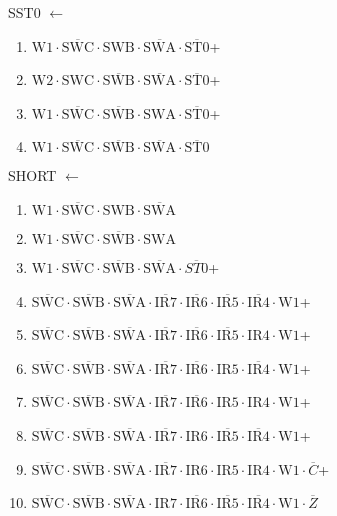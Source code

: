 \documentclass[UTF8]{ctexart}
\begin{document}
SST0 $\leftarrow$
\begin{enumerate}[\indent\indent]
	\item $\text{W1} \cdot \overline{\text{SWC}} \cdot \text{SWB} \cdot \overline{\text{SWA}} \cdot \overline{\text{ST0}}$+
	\item $\text{W2} \cdot \text{SWC} \cdot \overline{\text{SWB}} \cdot \overline{\text{SWA}} \cdot \overline{\text{ST0}}$+
	\item $\text{W1} \cdot \overline{\text{SWC}} \cdot \overline{\text{SWB}} \cdot \text{SWA} \cdot \overline{\text{ST0}}$+
	\item $\text{W1} \cdot \overline{\text{SWC}} \cdot \overline{\text{SWB}} \cdot \overline{\text{SWA}} \cdot \overline{\text{ST0}}$
\end{enumerate}

SHORT $\leftarrow$
\begin{enumerate}[\indent\indent]
	\item $\text{W1} \cdot \overline{\text{SWC}} \cdot \text{SWB} \cdot \overline{\text{SWA}}$
	\item $\text{W1} \cdot \overline{\text{SWC}} \cdot \overline{\text{SWB}} \cdot \text{SWA}$
	\item $\text{W1} \cdot \overline{\text{SWC}} \cdot \overline{\text{SWB}} \cdot \overline{\text{SWA}} \cdot \overline{ST0}$+
	\item $\overline{\text{SWC}} \cdot\overline{\text{SWB}}\cdot \overline{\text{SWA}} \cdot \overline{\text{IR7}} \cdot \overline{\text{IR6}} \cdot \overline{\text{IR5}} \cdot \overline{\text{IR4}} \cdot \text{W1}$+
	\item $\overline{\text{SWC}} \cdot\overline{\text{SWB}}\cdot \overline{\text{SWA}} \cdot \overline{\text{IR7}} \cdot \overline{\text{IR6}} \cdot \overline{\text{IR5}} \cdot \text{IR4} \cdot \text{W1}$+
	\item $\overline{\text{SWC}} \cdot\overline{\text{SWB}}\cdot \overline{\text{SWA}} \cdot \overline{\text{IR7}} \cdot \overline{\text{IR6}} \cdot \text{IR5} \cdot \overline{\text{IR4}} \cdot \text{W1}$+
	\item $\overline{\text{SWC}} \cdot\overline{\text{SWB}}\cdot \overline{\text{SWA}} \cdot \overline{\text{IR7}} \cdot \overline{\text{IR6}} \cdot \text{IR5} \cdot \text{IR4} \cdot \text{W1}$+
	\item $\overline{\text{SWC}} \cdot\overline{\text{SWB}}\cdot \overline{\text{SWA}} \cdot \overline{\text{IR7}} \cdot \text{IR6} \cdot \overline{\text{IR5}} \cdot \overline{\text{IR4}} \cdot \text{W1}$+
	\item $\overline{\text{SWC}} \cdot\overline{\text{SWB}}\cdot \overline{\text{SWA}} \cdot \overline{\text{IR7}} \cdot \text{IR6} \cdot \text{IR5} \cdot \text{IR4} \cdot \text{W1} \cdot \overline{C}$+
	\item $\overline{\text{SWC}} \cdot\overline{\text{SWB}}\cdot \overline{\text{SWA}} \cdot \text{IR7} \cdot \overline{\text{IR6}} \cdot \overline{\text{IR5}} \cdot \overline{\text{IR4}} \cdot \text{W1} \cdot \overline{Z}$
\end{enumerate}
\end{document}
